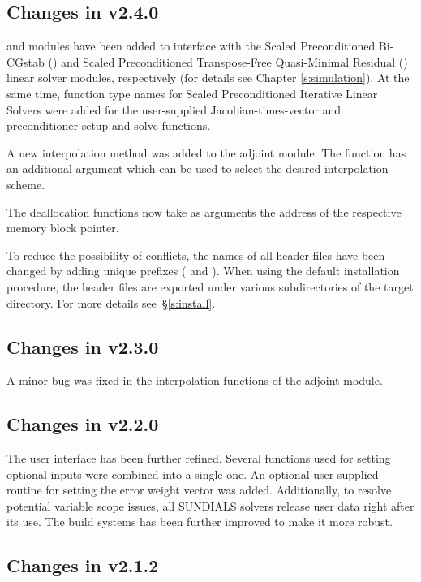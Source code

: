 \subsection*{Changes in v2.4.0}

{\cvspbcg} and {\cvsptfqmr} modules have been added to interface with the
Scaled Preconditioned Bi-CGstab ({\spbcg}) and Scaled Preconditioned
Transpose-Free Quasi-Minimal Residual ({\sptfqmr}) linear solver modules,
respectively (for details see Chapter \ref{s:simulation}).
At the same time, function type names for Scaled Preconditioned Iterative
Linear Solvers were added for the user-supplied Jacobian-times-vector and
preconditioner setup and solve functions.

A new interpolation method was added to the {\cvodea} adjoint module. The
function  has an additional argument which can be used to select
the desired interpolation scheme.

The deallocation functions now take as arguments the address of the respective 
memory block pointer.

To reduce the possibility of conflicts, the names of all header files have
been changed by adding unique prefixes ( and ).
When using the default installation procedure, the header files are exported
under various subdirectories of the target  directory. For more
details see~\S\ref{s:install}.

\subsection*{Changes in v2.3.0}

A minor bug was fixed in the interpolation functions of the adjoint
{\cvodea} module.

\subsection*{Changes in v2.2.0}

The user interface has been further refined. Several functions used
for setting optional inputs were combined into a single one.  An
optional user-supplied routine for setting the error weight vector was
added.  Additionally, to resolve potential variable scope issues, all
SUNDIALS solvers release user data right after its use. The build
systems has been further improved to make it more robust.

\subsection*{Changes in v2.1.2}

